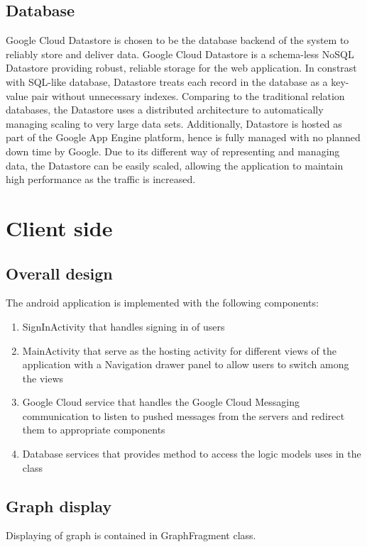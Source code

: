 \subsection{Database}
Google Cloud Datastore is chosen to be the database backend of the system to reliably store and deliver data. Google
Cloud Datastore is a schema-less NoSQL Datastore providing robust, reliable storage for the web application. In
constrast with SQL-like database, Datastore treats each record in the database as a key-value pair without unnecessary
indexes. Comparing to the traditional relation databases, the Datastore uses a distributed architecture to automatically
managing scaling to very large data sets. Additionally, Datastore is hosted as part of the Google App Engine platform,
hence is fully managed with no planned down time by Google. Due to its different way of representing and managing data,
the Datastore can be easily scaled, allowing the application to maintain high performance as the traffic is increased.

\section{Client side}
\subsection{Overall design}
The android application is implemented with the following components:
\begin{enumerate}
    \item SignInActivity that handles signing in of users
    \item MainActivity that serve as the hosting activity for different views of the application with a Navigation
        drawer panel to allow users to switch among the views
    \item Google Cloud service that handles the Google Cloud Messaging communication to listen to pushed messages from
        the servers and redirect them to appropriate components
    \item Database services that provides method to access the logic models uses in the class
\end{enumerate}

\subsection{Graph display}
Displaying of graph is contained in GraphFragment class.

